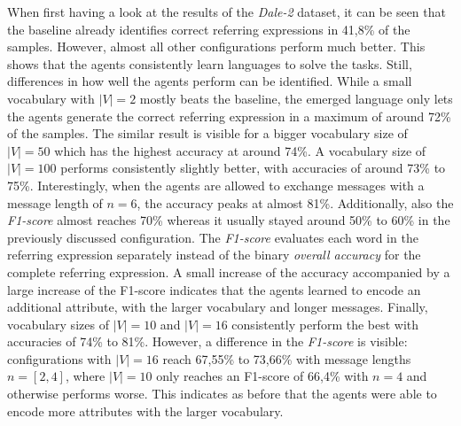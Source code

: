 When first having a look at the results of the \emph{Dale-2} dataset, it can be seen that the baseline already identifies correct referring expressions in 41,8\% of the samples.
However, almost all other configurations perform much better.
This shows that the agents consistently learn languages to solve the tasks.
Still, differences in how well the agents perform can be identified.
While a small vocabulary with $|V| = 2$ mostly beats the baseline, the emerged language only lets the agents generate the correct referring expression in a maximum of around 72\% of the samples.
The similar result is visible for a bigger vocabulary size of $|V|=50$ which has the highest accuracy at around 74\%.
A vocabulary size of $|V|=100$ performs consistently slightly better, with accuracies of around 73\% to 75\%.
Interestingly, when the agents are allowed to exchange messages with a message length of $n=6$, the accuracy peaks at almost 81\%.
Additionally, also the \emph{F1-score} almost reaches 70\% whereas it usually stayed around 50\% to 60\% in the previously discussed configuration.
The \emph{F1-score} evaluates each word in the referring expression separately instead of the binary \emph{overall accuracy} for the complete referring expression.
A small increase of the accuracy accompanied by a large increase of the F1-score indicates that the agents learned to encode an additional attribute, with the larger vocabulary and longer messages.
Finally, vocabulary sizes of $|V|=10$ and $|V|=16$ consistently perform the best with accuracies of 74\% to 81\%.
However, a difference in the \emph{F1-score} is visible: configurations with $|V|=16$ reach 67,55\% to 73,66\% with message lengths $n=[2,4]$, where $|V|=10$ only reaches an F1-score of 66,4\% with $n=4$ and otherwise performs worse.
This indicates as before that the agents were able to encode more attributes with the larger vocabulary.

